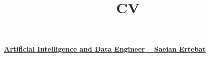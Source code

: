 
\usepackage{lipsum} %
\usepackage{multicol}
\usepackage{graphicx}
\usepackage[scale=0.8]{geometry}%
\usepackage{fontawesome}

\newcommand*{\authorimg}[1]{%
	\raisebox{-.3\baselineskip}{%
		\texttt{[image: \#1]}%
	}%
}

\title{CV}

\address{\textbf{\href{http://shahed.ac.ir/pages/home.aspx}{University of Shahed -- Department of Computer Science}{}}}{\textbf{\href{http://www.senatelecom.com/}{Artificial Intelligence and Data Engineer -- Saeian Ertebat}{}}}{}





